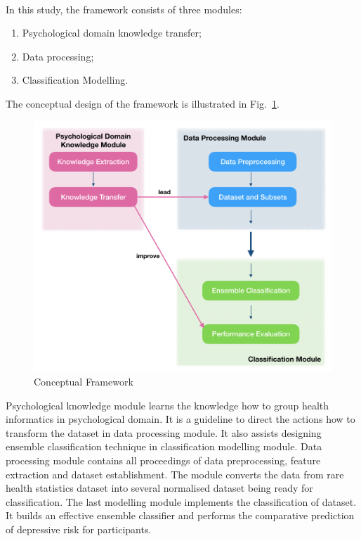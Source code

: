 \documentclass[runningheads]{llncs}
\begin{document}
\paragraph{}
In this study, the framework consists of three modules:
\begin{enumerate}
  \item Psychological domain knowledge transfer;
  \item Data processing;
  \item Classification Modelling.
\end{enumerate}
The conceptual design of the framework is illustrated in Fig.~\ref{fig1}.
\begin{figure}[h]
\includegraphics[width=1\textwidth]{concepts.png}
\caption{Conceptual Framework} \label{fig1}
\end{figure}
%
Psychological knowledge module learns the knowledge how to group health informatics in psychological domain. It is a guideline to direct the actions how to transform the dataset in data processing module. It also assists designing ensemble classification technique in classification modelling module. Data processing module contains all proceedings of data preprocessing, feature extraction and dataset establishment. The module converts the data from rare health statistics dataset into several normalised dataset being ready for classification. The last modelling module implements the classification of dataset. It builds an effective ensemble classifier and performs the comparative prediction of depressive risk for participants. 
%
%
\end{document}
